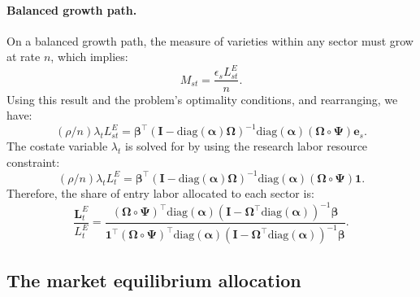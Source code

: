 \documentclass[12pt]{article}
\begin{document}
\paragraph{Balanced growth path.} On a balanced growth path, the measure of varieties within any sector must grow at rate $n$, which implies:
\begin{equation*}
    M_{st} = \frac{\epsilon_s L_{st}^E}{n}.
\end{equation*}
Using this result and the problem's optimality conditions, and rearranging, we have:
\begin{equation*}
    (\rho / n) \lambda_t L_{st}^E = \bm{\beta}^{\top} (\mathbf{I} - \text{diag}(\bm{\alpha}) \bm{\Omega})^{-1} \text{diag}(\bm{\alpha}) (\bm{\Omega} \circ \bm{\Psi}) \mathbf{e}_s.
\end{equation*}
The costate variable $\lambda_t$ is solved for by using the research labor resource constraint:
\begin{equation*}
    (\rho / n) \lambda_t L_t^E = \bm{\beta}^{\top} (\mathbf{I} - \text{diag}(\bm{\alpha}) \bm{\Omega})^{-1} \text{diag}(\bm{\alpha}) (\bm{\Omega} \circ \bm{\Psi}) \mathbf{1}.
\end{equation*}
Therefore, the share of entry labor allocated to each sector is:
\begin{equation*}
    \frac{\mathbf{L}_t^E}{L_t^E} = \frac{(\bm{\Omega} \circ \bm{\Psi})^{\top} \text{diag}(\bm{\alpha}) (\mathbf{I} - \bm{\Omega}^{\top} \text{diag}(\bm{\alpha}))^{-1} \bm{\beta}}{\mathbf{1}^{\top} (\bm{\Omega} \circ \bm{\Psi})^{\top} \text{diag}(\bm{\alpha}) (\mathbf{I} - \bm{\Omega}^{\top} \text{diag}(\bm{\alpha}))^{-1} \bm{\beta}}.
\end{equation*}

\subsection{The market equilibrium allocation}
\label{a:market equilibrium allocation}
\end{document}
